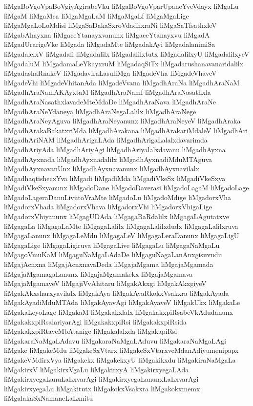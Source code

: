 {liMgaBoVgoVpaBoVgiyAgirabeVku
liMgaBoVgoVparUpaneYveVdayx
liMgaLu
liMgaM
liMgaMca
liMgaMgaLaM
liMgaMgaLf
liMgaMgaLige
liMgaMgaLoLoMdisi
liMgaSaDakaSxroVdadhxraNi
liMgaSaTfsathxleV
liMgabAhayxna
liMgaceYtanayxvanunx
liMgaceYtanayxvu
liMgadA
liMgadUrarigeVke
liMgada
liMgadaMte
liMgadakAyi
liMgadalanimiSa
liMgadalelxV
liMgadali
liMgadalilx
liMgadalilxtutx
liMgadalilxyU
liMgadalilxyeV
liMgadaluM
liMgadamaLeYkayxruM
liMgadaqSiTx
liMgadarushanavanaridalilx
liMgadashaRnakeV
liMgadaviraLasuliMga
liMgadeVha
liMgadeVhaveV
liMgadeVhi
liMgadeVhitanAda
liMgadeVvana
liMgadhAraNa
liMgadhAraNaM
liMgadhAraNamAKAyxtaM
liMgadhAraNamf
liMgadhAraNasathxla
liMgadhAraNasathxlavadeMteMdaDe
liMgadhAraNava
liMgadhAraNe
liMgadhAraNeYdaneya
liMgadhAraNegaLalilx
liMgadhAraNege
liMgadhAraNeyAguva
liMgadhAraNeyanunx
liMgadhAraNeyeV
liMgadhAraka
liMgadhArakaBakatxriMda
liMgadhArakana
liMgadhArakariMdaleV
liMgadhAri
liMgadhAriNAM
liMgadhArigaLAda
liMgadhArigaLalalxdavarimda
liMgadhAriyAda
liMgadhAriyAgi
liMgadhAriyalalxdavanu
liMgadhAyxna
liMgadhAyxnada
liMgadhAyxnadalilx
liMgadhAyxnadiMduMTAguva
liMgadhAyxnavanUnx
liMgadhAyxnavanunx
liMgadhAyxnavilalx
liMgadhaqtishecxYva
liMgadi
liMgadiMda
liMgadiVkeSx
liMgadiVkeSxya
liMgadiVkeSxyanunx
liMgadoDane
liMgadoDaverasi
liMgadoLagaM
liMgadoLage
liMgadoLageraDanuLivutoVraMte
liMgadoLu
liMgadoMdige
liMgadorxVha
liMgadorxVhada
liMgadorxVhava
liMgadorxVhi
liMgadorxVhigaLige
liMgadorxVhiyanunx
liMgagUDAda
liMgagaBaRdalilx
liMgagaLAgutatxve
liMgagaLa
liMgagaLaMte
liMgagaLalilx
liMgagaLalilxdudx
liMgagaLalilxruva
liMgagaLanunx
liMgagaLeMdu
liMgagaLeV
liMgagaLeraDanunx
liMgagaLigU
liMgagaLige
liMgagaLigiruva
liMgagaLive
liMgagaLu
liMgagaNaMgaLu
liMgagoVmuKaM
liMgaguNaMgaLAdaDe
liMgaguNagaLanAnxgisuvudu
liMgajAcnxna
liMgajAcnxnavaDeda
liMgajaMgama
liMgajaMgamada
liMgajaMgamagaLanunx
liMgajaMgamakekx
liMgajaMgamava
liMgajaMgamaveV
liMgajiVvAhitaru
liMgakAkxgi
liMgakAkxgiyeV
liMgakAkxsharxyavilalx
liMgakAya
liMgakAyaRkokxVsakxra
liMgakAyada
liMgakAyadiMduMTAda
liMgakAyavAgi
liMgakAyaveV
liMgakUkx
liMgakaLe
liMgakaLeyoLage
liMgakaM
liMgakakxlalx
liMgakakxpiRsabeVkAdudanunx
liMgakakxpiRsalariyarAgi
liMgakakxpiRsi
liMgakakxpiRsida
liMgakakxpiRtaveMbAtanige
liMgakalalxda
liMgakapiRsi
liMgakaraNaMgaLAdavu
liMgakaraNaMgaLAduvu
liMgakaraNaMgaLAgi
liMgake
liMgakeMdu
liMgakeSxVtarx
liMgakeSxVtarxveMdanAdiyumenipapx
liMgakeVMdirxVya
liMgakekx
liMgakekxyU
liMgakikxdu
liMgakiraNaMgaLa
liMgakirxV
liMgakirxVgaLu
liMgakirxyA
liMgakirxyegaLAda
liMgakirxyegaLanuLaLxvarAgi
liMgakirxyegaLanunxLaLxvarAgi
liMgakirxyegaLu
liMgakitutx
liMgakokxVsakxra
liMgakokxmemx
liMgalakaSxNamaneLaLxnitu
}

